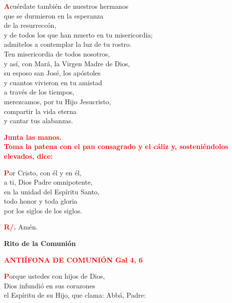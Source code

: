 \documentclass[12pt, letterpaper, spanish]{report}
\begin{document}
\lettrine{\bfseries \textcolor{red}{A}}{}cu\'erdate tambi\'en de nuestros hermanos\\
que se durmieron en la esperanza\\
de la resurrecc\'on,\\
y de todos los que han muerto en tu misericordia;\\
admitelos a contemplar la luz de tu rostro.\\
Ten misericordia de todos nosotros,\\
y as\'i, con Mar\'a, la Virgen Madre de Dios,\\
su esposo san Jos\'e, los ap\'ostoles\\
y cuantos vivieron en tu amistad\\
a trav\'es de los tiempos,\\
merezcamos, por tu Hijo Jesucristo,\\
compartir la vida eterna\\
y cantar tus alabanzas.\newline

\large{\bfseries \textcolor{red}{Junta las manos.\\
Toma la patena con el pan consagrado y el c\'aliz y, sosteni\'endolos elevados, dice:}} \newline

\lettrine{\bfseries \textcolor{red}{P}}{}or Cristo, con \'el y en \'el,\\
a ti, Dios Padre omnipotente,\\
en la unidad del Esp\'iritu Santo,\\
todo honor y toda gloria\\
por los siglos de los siglos.\newline

\Large \hspace{-0.9cm} {\bfseries \textcolor{red}{R/.}} \hspace{0.5cm} Am\'en.\newline

\newpage

\begin{center} 
\Huge {\bfseries Rito de la Comuni\'on}
\end{center}

\Large {\bfseries \textcolor{red}{ANTI\'IFONA DE COMUNI\'ON \hspace{2cm} \large Gal 4, 6}} \newline

\Large \lettrine{\bfseries \textcolor{red}{P}}{}orque ustedes con hijos de Dios,\\
Dios infundi\'o en sus corazones\\
el Esp\'iritu de su Hijo, que clama: Abb\'a, Padre:\newline
\end{document}

